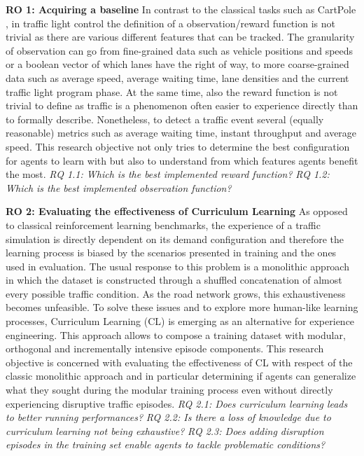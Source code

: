 \hfill \break
\noindent
\textbf{\hypertarget{ro1}{RO 1}: Acquiring a baseline}
\hfill \break
In contrast to the classical tasks such as CartPole \cite{nagendra2017comparison}, in traffic light control the definition of a observation/reward function is not trivial as there are various different features that can be tracked.
The granularity of observation can go from fine-grained data such as vehicle positions and speeds or a boolean vector of which lanes have the right of way, to more coarse-grained data such as average speed, average waiting time, lane densities and the current traffic light program phase.
At the same time, also the reward function is not trivial to define as traffic is a phenomenon often easier to experience directly than to formally describe.
Nonetheless, to detect a traffic event several (equally reasonable) metrics such as average waiting time, instant throughput and average speed.
This research objective not only tries to determine the best configuration for agents to learn with but also to understand from which features agents benefit the most.
\hfill \break
\textit{\hypertarget{rq1.1}{RQ 1.1}: Which is the best implemented reward function?}
\hfill \break
\textit{\hypertarget{rq1.2}{RQ 1.2}: Which is the best implemented observation function?}

\hfill \break
\noindent
\textbf{\hypertarget{ro2}{RO 2}: Evaluating the effectiveness of Curriculum Learning}
\hfill \break
As opposed to classical reinforcement learning benchmarks, the experience of a traffic simulation is directly dependent on its demand configuration and therefore the learning process is biased by the scenarios presented in training and the ones used in evaluation.
The usual response to this problem is a monolithic approach in which the dataset is constructed through a shuffled concatenation of almost every possible traffic condition.
As the road network grows, this exhaustiveness becomes unfeasible.
To solve these issues and to explore more human-like learning processes, Curriculum Learning (CL) is emerging as an alternative for experience engineering.
This approach allows to compose a training dataset with modular, orthogonal and incrementally intensive episode components.
This research objective is concerned with evaluating the effectiveness of CL with respect of the classic monolithic approach and in particular determining if agents can generalize what they sought during the modular training process even without directly experiencing disruptive traffic episodes.
\hfill \break
\textit{\hypertarget{rq2.1}{RQ 2.1}: Does curriculum learning leads to better running performances?}
\hfill \break
\textit{\hypertarget{rq2.2}{RQ 2.2}: Is there a loss of knowledge due to curriculum learning not being exhaustive?}
\hfill \break
\textit{\hypertarget{rq2.3}{RQ 2.3}: Does adding disruption episodes in the training set enable agents to tackle problematic conditions?}

